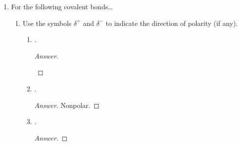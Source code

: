 \documentclass[../psets.tex]{subfiles}
\begin{document}
\begin{enumerate}
\begin{enumerate}
        \begin{proof}[Answer]
            ${\color{white}hi}$
            \begin{center}
            \end{center}
            Nonpolar covalent.
        \end{proof}
        \item {}.
        \begin{proof}[Answer]
            ${\color{white}hi}$
            \begin{center}
            \end{center}
            Polar covalent.
        \end{proof}
        \item {}.
        \begin{proof}[Answer]
            ${\color{white}hi}$
            \begin{center}
            \end{center}
            Ionic.
        \end{proof}
    \end{enumerate}
    \item For the following covalent bonds\dots
    \begin{enumerate}
        \item Use the symbols $\delta^+$ and $\delta^-$ to indicate the direction of polarity (if any).
        \begin{enumerate}
            \item {}.
            \begin{proof}[Answer]
                ${\color{white}hi}$
                \begin{center}
                \end{center}
            \end{proof}
            \item {}.
            \begin{proof}[Answer]
                Nonpolar.
            \end{proof}
            \item {}.
            \begin{proof}[Answer]

\end{proof}
\end{enumerate}
\end{enumerate}
\end{enumerate}
\end{document}
